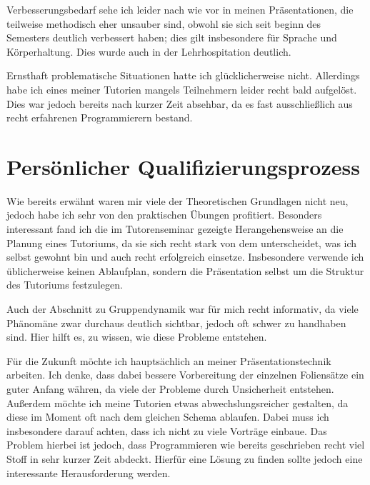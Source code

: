 \documentclass[%
fontsize=12pt,
paper=a4,
oneside,
DIV=13,
BCOR=0cm,
pagesize=automedia,
parskip=false,
headings=normal,
titlepage=true%
]{scrartcl}
\begin{document}
Verbesserungsbedarf sehe ich leider nach wie vor in meinen Pr\"asentationen,
die teilweise methodisch eher unsauber sind, obwohl sie
sich seit beginn des Semesters deutlich verbessert haben; dies gilt insbesondere
f\"ur Sprache und K\"orperhaltung. Dies wurde auch in der
Lehrhospitation deutlich.

Ernsthaft problematische Situationen hatte ich gl\"ucklicherweise nicht.
Allerdings habe ich eines meiner Tutorien mangels Teilnehmern leider recht bald
aufgel\"ost. Dies war jedoch bereits nach kurzer Zeit absehbar, da es fast
ausschlie\ss{}lich aus recht erfahrenen Programmierern bestand.

\section{Pers\"onlicher Qualifizierungsprozess}
Wie bereits erw\"ahnt waren mir viele der Theoretischen Grundlagen nicht neu,
jedoch habe ich sehr von den praktischen \"Ubungen profitiert.
Besonders interessant fand ich die im Tutorenseminar gezeigte Herangehensweise
an die Planung eines Tutoriums, da sie sich recht stark
von dem unterscheidet, was ich selbst gewohnt bin und auch recht erfolgreich
einsetze. Insbesondere verwende ich \"ublicherweise keinen
Ablaufplan, sondern die Pr\"asentation selbst um die Struktur des Tutoriums
festzulegen.

Auch der Abschnitt zu Gruppendynamik war f\"ur mich recht informativ, da viele
Ph\"anom\"ane zwar durchaus deutlich sichtbar, jedoch oft schwer zu handhaben
sind. Hier hilft es, zu wissen, wie diese Probleme entstehen.

F\"ur die Zukunft m\"ochte ich haupts\"achlich an meiner Pr\"asentationstechnik
arbeiten. Ich denke, dass dabei bessere Vorbereitung der einzelnen
Foliens\"atze ein guter Anfang w\"ahren, da viele der Probleme durch
Unsicherheit entstehen. Au\ss{}erdem m\"ochte ich meine Tutorien etwas
abwechslungsreicher gestalten, da diese im Moment oft nach dem gleichen Schema
ablaufen. Dabei muss ich insbesondere darauf achten, dass ich nicht zu viele
Vortr\"age einbaue. Das Problem hierbei ist jedoch, dass Programmieren wie
bereits geschrieben recht viel Stoff in sehr kurzer Zeit abdeckt. Hierf\"ur
eine L\"osung zu finden sollte jedoch eine interessante Herausforderung
werden.
\clearpage
\end{document}
